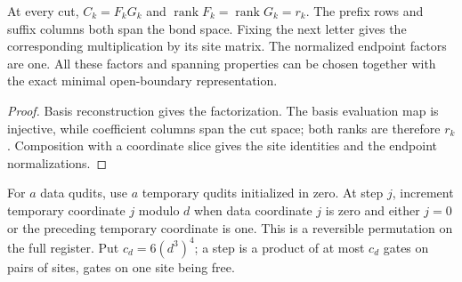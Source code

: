 \begin{lemma}
    \label{thm:mpu_minimal_cut_factors}
    \leanok
    At every cut, $C_k=F_kG_k$ and
    $\operatorname{rank}F_k=\operatorname{rank}G_k=r_k$.
    The prefix rows and suffix columns both span the bond space.
    Fixing the next letter gives the corresponding multiplication
    by its site matrix. The normalized endpoint factors are one.
    All these factors and spanning properties can be chosen together
    with the exact minimal open-boundary representation.
\end{lemma}
\begin{proof}\leanok
    Basis reconstruction gives the factorization. The basis evaluation
    map is injective, while coefficient columns span the cut space;
    both ranks are therefore $r_k$. Composition with a coordinate
    slice gives the site identities and the endpoint normalizations.
\end{proof}

\begin{definition}
    \label{def:mpu_reversible_zero_conjunction}
    \leanok
    For $a$ data qudits, use $a$ temporary qudits initialized in zero.
    At step $j$, increment temporary coordinate $j$ modulo $d$ when
    data coordinate $j$ is zero and either $j=0$ or the preceding
    temporary coordinate is one. This is a reversible permutation
    on the full register. Put $c_d=6(d^3)^4$; a step is a product of
    at most $c_d$ gates on pairs of sites, gates on one site being
    free.
\end{definition}

